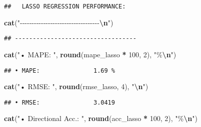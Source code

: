 \documentclass[
]{article}
\newenvironment{Shaded}{\begin{snugshade}}{\end{snugshade}}
\newcommand{\DecValTok}[1]{\textcolor[rgb]{0.00,0.00,0.81}{#1}}
\newcommand{\FunctionTok}[1]{\textcolor[rgb]{0.13,0.29,0.53}{\textbf{#1}}}
\newcommand{\NormalTok}[1]{#1}
\newcommand{\SpecialCharTok}[1]{\textcolor[rgb]{0.81,0.36,0.00}{\textbf{#1}}}
\newcommand{\StringTok}[1]{\textcolor[rgb]{0.31,0.60,0.02}{#1}}
\begin{document}
\begin{verbatim}
##   LASSO REGRESSION PERFORMANCE:
\end{verbatim}

\begin{Shaded}
\begin{Highlighting}[]
\FunctionTok{cat}\NormalTok{(}\StringTok{"{-}{-}{-}{-}{-}{-}{-}{-}{-}{-}{-}{-}{-}{-}{-}{-}{-}{-}{-}{-}{-}{-}{-}{-}{-}{-}{-}{-}{-}{-}{-}{-}{-}{-}}\SpecialCharTok{\textbackslash{}n}\StringTok{"}\NormalTok{)}
\end{Highlighting}
\end{Shaded}

\begin{verbatim}
## ----------------------------------
\end{verbatim}

\begin{Shaded}
\begin{Highlighting}[]
\FunctionTok{cat}\NormalTok{(}\StringTok{"• MAPE:              "}\NormalTok{, }\FunctionTok{round}\NormalTok{(mape\_lasso }\SpecialCharTok{*} \DecValTok{100}\NormalTok{, }\DecValTok{2}\NormalTok{), }\StringTok{"\%}\SpecialCharTok{\textbackslash{}n}\StringTok{"}\NormalTok{)}
\end{Highlighting}
\end{Shaded}

\begin{verbatim}
## • MAPE:               1.69 %
\end{verbatim}

\begin{Shaded}
\begin{Highlighting}[]
\FunctionTok{cat}\NormalTok{(}\StringTok{"• RMSE:              "}\NormalTok{, }\FunctionTok{round}\NormalTok{(rmse\_lasso, }\DecValTok{4}\NormalTok{), }\StringTok{"}\SpecialCharTok{\textbackslash{}n}\StringTok{"}\NormalTok{)}
\end{Highlighting}
\end{Shaded}

\begin{verbatim}
## • RMSE:               3.0419
\end{verbatim}

\begin{Shaded}
\begin{Highlighting}[]
\FunctionTok{cat}\NormalTok{(}\StringTok{"• Directional Acc.:  "}\NormalTok{, }\FunctionTok{round}\NormalTok{(acc\_lasso }\SpecialCharTok{*} \DecValTok{100}\NormalTok{, }\DecValTok{2}\NormalTok{), }\StringTok{"\%}\SpecialCharTok{\textbackslash{}n}\StringTok{"}\NormalTok{)}
\end{Highlighting}
\end{Shaded}
\end{document}
